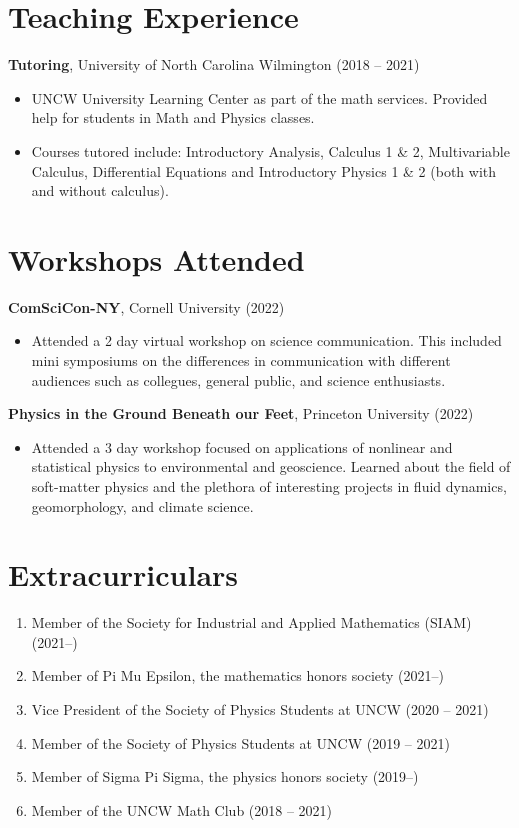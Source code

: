 \documentclass[12pt]{article}
\begin{document}
\section{Teaching Experience }
\textbf{Tutoring}, University of North Carolina Wilmington \hfill (2018 -- 2021)
\begin{itemize}
    \itemsep = 0em
    \item UNCW University Learning Center as part of the math services. Provided help for students in Math and Physics classes.
    \item Courses tutored include: Introductory Analysis, Calculus 1 \& 2, Multivariable Calculus, Differential Equations and Introductory Physics 1 \& 2 (both with and without calculus).
\end{itemize}

\section{Workshops Attended}
\textbf{ComSciCon-NY}, Cornell University \hfill (2022)
\begin{itemize}
    \itemsep = 0em
    \item Attended a 2 day virtual workshop on science communication. This included mini symposiums on the differences in communication with different audiences such as collegues, general public, and science enthusiasts.
\end{itemize}

\textbf{Physics in the Ground Beneath our Feet}, Princeton University \hfill (2022)
\begin{itemize}
    \itemsep = 0em
    \item Attended a 3 day workshop focused on applications of nonlinear and statistical physics to environmental and geoscience. Learned about the field of soft-matter physics and the plethora of interesting projects in fluid dynamics, geomorphology, and climate science.
\end{itemize}


\section{Extracurriculars}
\begin{enumerate}
    \itemsep = 0em
    \item Member of the Society for Industrial and Applied Mathematics (SIAM) \hfill (2021--)
    \item Member of Pi Mu Epsilon, the mathematics honors society \hfill (2021--)
    \item Vice President of the Society of Physics Students at UNCW \hfill (2020 -- 2021)
    \item Member of the Society of Physics Students at UNCW \hfill (2019 -- 2021)
    \item Member of Sigma Pi Sigma, the physics honors society \hfill (2019--)
    \item Member of the UNCW Math Club \hfill (2018 -- 2021)

\end{enumerate}
\end{document}
